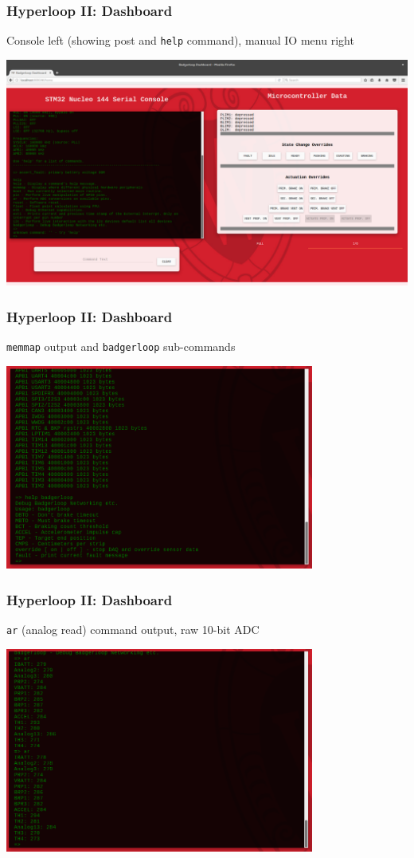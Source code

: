 \documentclass{beamer}
\begin{document}
\begin{frame}
\frametitle{Hyperloop II: Dashboard}
    Console left (showing post and \texttt{help} command), manual IO menu right
\begin{center}
    \includegraphics[width=\linewidth]{assets/badgerloop_2/Dashboard/dash_live2}
\end{center}
\end{frame}

\begin{frame}
\frametitle{Hyperloop II: Dashboard}
    \texttt{memmap} output and \texttt{badgerloop} sub-commands
\begin{center}
    \includegraphics[width=4in]{assets/badgerloop_2/Dashboard/dash_cli_example}
\end{center}
\end{frame}

\begin{frame}
\frametitle{Hyperloop II: Dashboard}
    \texttt{ar} (analog read) command output, raw 10-bit ADC
\begin{center}
    \includegraphics[width=4in]{assets/badgerloop_2/Dashboard/dash_live_ar}
\end{center}
\end{frame}
\end{document}
